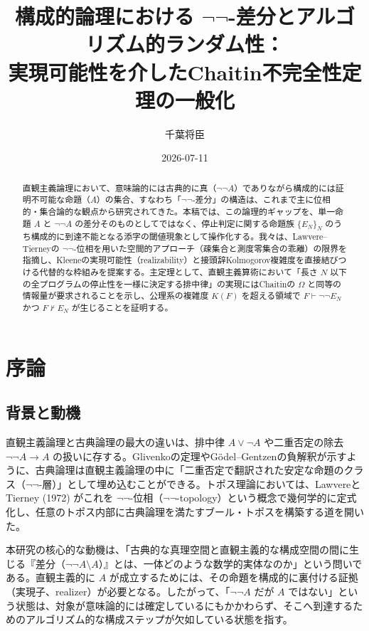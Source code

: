 \documentclass[a4paper,11pt]{ltjsarticle}
\title{構成的論理における $\neg\neg$-差分とアルゴリズム的ランダム性：\\実現可能性を介したChaitin不完全性定理の一般化}
\author{千葉将臣}
\date{2026-07-11}
\theoremstyle{plain}
\begin{document}
\maketitle

\begin{abstract}
直観主義論理において、意味論的には古典的に真（$\neg\neg A$）でありながら構成的には証明不可能な命題（$A$）の集合、すなわち「$\neg\neg$-差分」の構造は、これまで主に位相的・集合論的な観点から研究されてきた。本稿では、この論理的ギャップを、単一命題 $A$ と $\neg\neg A$ の差分そのものとしてではなく、停止判定に関する命題族 $\{E_N\}_N$ のうち構成的に到達不能となる添字の閾値現象として操作化する。我々は、Lawvere--Tierneyの $\neg\neg$-位相を用いた空間的アプローチ（疎集合と測度零集合の乖離）の限界を指摘し、Kleeneの実現可能性（realizability）と接頭辞Kolmogorov複雑度を直接結びつける代替的な枠組みを提案する。主定理として、直観主義算術において「長さ $N$ 以下の全プログラムの停止性を一様に決定する排中律」の実現にはChaitinの $\Omega$ と同等の情報量が要求されることを示し、公理系の複雑度 $K(F)$ を超える領域で $F \vdash \neg\neg E_N$ かつ $F \nvdash E_N$ が生じることを証明する。
\end{abstract}

\section{序論}

\subsection{背景と動機}

直観主義論理と古典論理の最大の違いは、排中律 $A \lor \neg A$ や二重否定の除去 $\neg\neg A \to A$ の扱いに存する。Glivenkoの定理やGödel--Gentzenの負解釈が示すように、古典論理は直観主義論理の中に「二重否定で翻訳された安定な命題のクラス（$\neg\neg$-層）」として埋め込むことができる。トポス理論においては、LawvereとTierney (1972) がこれを $\neg\neg$-位相（$\neg\neg$-topology）という概念で幾何学的に定式化し、任意のトポス内部に古典論理を満たすブール・トポスを構築する道を開いた。

本研究の核心的な動機は、「古典的な真理空間と直観主義的な構成空間の間に生じる『差分（$\neg\neg A \setminus A$）』とは、一体どのような数学的実体なのか」という問いである。直観主義的に $A$ が成立するためには、その命題を構成的に裏付ける証拠（実現子、realizer）が必要となる。したがって、「$\neg\neg A$ だが $A$ ではない」という状態は、対象が意味論的には確定しているにもかかわらず、そこへ到達するためのアルゴリズム的な構成ステップが欠如している状態を指す。
\end{document}
